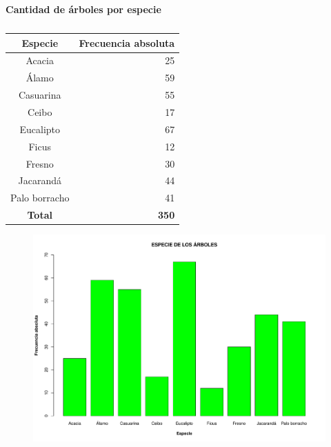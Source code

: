 \documentclass[11pt]{article}
\begin{document}
\begin{table}[h!]
  \begin{center}
    \caption*{\textbf{Cantidad de árboles por especie}}
    \begin{tabular}{| c | r |}
      \hline
      \textbf{Especie} & \textbf{Frecuencia absoluta} \\ \hline
      Acacia           & 25                           \\ \hline
      Álamo            & 59                           \\ \hline
      Casuarina        & 55                           \\ \hline
      Ceibo            & 17                           \\ \hline
      Eucalipto        & 67                           \\ \hline
      Ficus            & 12                           \\ \hline
      Fresno           & 30                           \\ \hline
      Jacarandá        & 44                           \\ \hline
      Palo borracho    & 41                           \\ \hline
      \textbf{Total}   & \textbf{350}                 \\ \hline
    \end{tabular}
    \caption{}
    \label{tab:tablaEspecie}
  \end{center}
\end{table}

\begin{figure}[h!]
  \begin{center}
    \includegraphics[width=0.9\linewidth]{barrasEspecie.pdf}
    \caption{}
    \label{fig:barrasEspecie}
  \end{center}
\end{figure}
\end{document}
